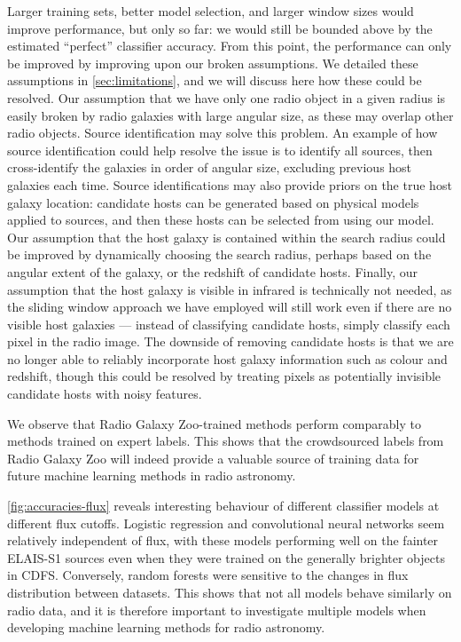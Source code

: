 \documentclass[fleqn,usenatbib,usedcolumn]{mnras}
\begin{document}
    Larger training sets, better model selection, and larger window sizes
    would improve performance, but only so far: we would still be bounded
    above by the estimated ``perfect'' classifier accuracy. From this point,
    the performance can only be improved by improving upon our broken
    assumptions. We detailed these assumptions in \autoref{sec:limitations},
    and we will discuss here how these could be resolved. Our assumption that
    we have only one radio object in a given radius is easily broken by radio
    galaxies with large angular size, as these may overlap other radio
    objects. Source identification may solve this problem. An example of how
    source identification could help resolve the issue is to identify all
    sources, then cross-identify the galaxies in order of angular size,
    excluding previous host galaxies each time. Source identifications may
    also provide priors on the true host galaxy location: candidate hosts can
    be generated based on physical models applied to sources, and then these
    hosts can be selected from using our model. Our assumption that the host
    galaxy is contained within the search radius could be improved by
    dynamically choosing the search radius, perhaps based on the angular
    extent of the galaxy, or the redshift of candidate hosts. Finally, our
    assumption that the host galaxy is visible in infrared is technically not
    needed, as the sliding window approach we have employed will still work
    even if there are no visible host galaxies --- instead of classifying
    candidate hosts, simply classify each pixel in the radio image. The
    downside of removing candidate hosts is that we are no longer able to
    reliably incorporate host galaxy information such as colour and redshift,
    though this could be resolved by treating pixels as potentially invisible
    candidate hosts with noisy features.

    We observe that Radio Galaxy Zoo-trained methods perform comparably to
    methods trained on expert labels. This shows that the crowdsourced labels
    from Radio Galaxy Zoo will indeed provide a valuable source of training
    data for future machine learning methods in radio astronomy.

    \autoref{fig:accuracies-flux} reveals interesting behaviour of different
    classifier models at different flux cutoffs. Logistic regression and
    convolutional neural networks seem relatively independent of flux, with
    these models performing well on the fainter ELAIS-S1 sources even when
    they were trained on the generally brighter objects in CDFS. Conversely,
    random forests were sensitive to the changes in flux distribution between
    datasets. This shows that not all models behave similarly on radio data,
    and it is therefore important to investigate multiple models when
    developing machine learning methods for radio astronomy.
\end{document}
